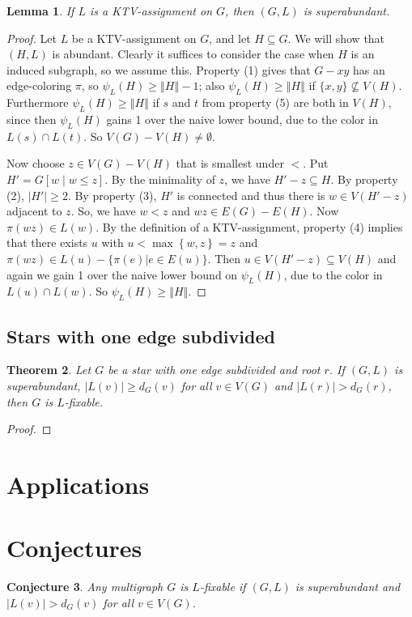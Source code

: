 \documentclass[12pt]{article}
\theoremstyle{plain}
\newtheorem{thm}{Theorem}[section]
\newtheorem{lem}[thm]{Lemma}
\newtheorem{conjecture}[thm]{Conjecture}
\theoremstyle{definition}
\theoremstyle{remark}
\newcommand{\set}[1]{\left\{ #1 \right\}}
\newcommand{\card}[1]{\left|#1\right|}
\newcommand{\size}[1]{\left\Vert#1\right\Vert}
\newcommand{\brackets}[1]{\left[ #1 \right]}
\begin{document}
\begin{lem}\label{KTVImpliesSuperabundant}
If $L$ is a KTV-assignment on $G$, then $(G, L)$ is superabundant.
\end{lem}
\begin{proof}
Let $L$ be a KTV-assignment on $G$, and let $H \subseteq G$.  We will show that
$(H,L)$ is abundant.  
Clearly it suffices to consider the case when $H$ is an induced subgraph, so we
assume this.
Property (1) gives that $G-xy$ has an edge-coloring
$\pi$, so $\psi_L(H)\ge \size{H}-1$; also $\psi_L(H)\ge \size{H}$ if
$\{x,y\}\not\subseteq V(H)$.  Furthermore $\psi_L(H)\ge \size{H}$ if $s$ and
$t$ from property (5) are both in $V(H)$, since then $\psi_L(H)$ gains 1 over
the naive lower bound, due to the color in $L(s)\cap L(t)$.  So $V(G)-
V(H)\ne \emptyset$.

Now choose $z \in V(G) - V(H)$ that is smallest under $<$.  
Put $H' = G\brackets{w \mid w \le z}$.  By the minimality of $z$, we have $H' - z \subseteq H$. By property (2), $\card{H'} \ge 2$.  
By property (3), $H'$ is connected and thus there is $w \in V(H' - z)$ adjacent to $z$. So, we have $w < z$ and $wz\in E(G)-E(H)$.
Now $\pi(wz)\in L(w)$.  By the definition of a KTV-assignment, 
property (4) implies that there exists $u$ with $u < \max\set{w, z} = z$ and $\pi(wz) \in
L(u)-\{\pi(e)|e\in E(u)\}$.  Then $u \in V(H' - z) \subseteq V(H)$ and
again we gain 1 over the naive lower bound on $\psi_L(H)$, due to the color
in $L(u)\cap L(w)$.  So $\psi_L(H)\ge \size{H}$.
\end{proof}

\subsection{Stars with one edge subdivided}
\begin{thm}
Let $G$ be a star with one edge subdivided and root $r$. If $(G, L)$ is superabundant, $|L(v)| \ge d_G(v)$ for all $v \in V(G)$ and $|L(r)| > d_G(r)$, then $G$ is $L$-fixable.
\end{thm}
\begin{proof}

\end{proof}
\section{Applications}

\section{Conjectures}
\begin{conjecture}
Any multigraph $G$ is $L$-fixable if $(G, L)$ is superabundant and $|L(v)| > d_G(v)$ for all $v \in V(G)$.
\end{conjecture}
\end{document}

